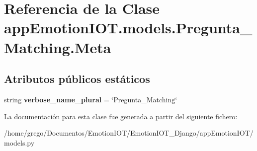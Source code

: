 \hypertarget{classappEmotionIOT_1_1models_1_1Pregunta__Matching_1_1Meta}{}\section{Referencia de la Clase app\+Emotion\+I\+O\+T.\+models.\+Pregunta\+\_\+\+Matching.\+Meta}
\label{classappEmotionIOT_1_1models_1_1Pregunta__Matching_1_1Meta}
\subsection*{Atributos públicos estáticos}
\begin{DoxyCompactItemize}
\item 
string {\bfseries verbose\+\_\+name\+\_\+plural} = \char`\"{}Pregunta\+\_\+\+Matching\char`\"{}\hypertarget{classappEmotionIOT_1_1models_1_1Pregunta__Matching_1_1Meta_a78105770414362e9685b415ca7d0a6ce}{}\label{classappEmotionIOT_1_1models_1_1Pregunta__Matching_1_1Meta_a78105770414362e9685b415ca7d0a6ce}

\end{DoxyCompactItemize}


La documentación para esta clase fue generada a partir del siguiente fichero\+:\begin{DoxyCompactItemize}
\item 
/home/grego/\+Documentos/\+Emotion\+I\+O\+T/\+Emotion\+I\+O\+T\+\_\+\+Django/app\+Emotion\+I\+O\+T/models.\+py\end{DoxyCompactItemize}
